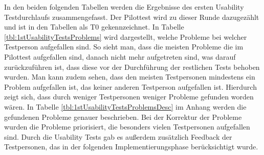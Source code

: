 In den beiden folgenden Tabellen werden die Ergebnisse des ersten Usability Testdurchlaufs zusammengefasst. Der Pilottest wird zu dieser Runde dazugezählt und ist in den Tabellen als T0 gekennzeichnet. In Tabelle \ref{tbl:1stUsabilityTestsProblems} wird dargestellt, welche Probleme bei welcher Testperson aufgefallen sind. So sieht man, dass die meisten Probleme die im Pilottest aufgefallen sind, danach nicht mehr aufgetreten sind, was darauf zurückzuführen ist, dass diese vor der Durchführung der restlichen Tests behoben wurden. Man kann zudem sehen, dass den meisten Testpersonen mindestens ein Problem aufgefallen ist, das keiner anderen Testperson aufgefallen ist. Hierdurch zeigt sich, dass durch weniger Testpersonen weniger Probleme gefunden worden wären. In Tabelle \ref{tbl:1stUsabilityTestsProblemsDesc} im Anhang werden die gefundenen Probleme genauer beschrieben. Bei der Korrektur der Probleme wurden die Probleme priorisiert, die besonders vielen Testpersonen aufgefallen sind. Durch die Usability Tests gab es außerdem zusätzlich Feedback der Testpersonen, das in der folgenden Implementierungsphase berücksichtigt wurde.

